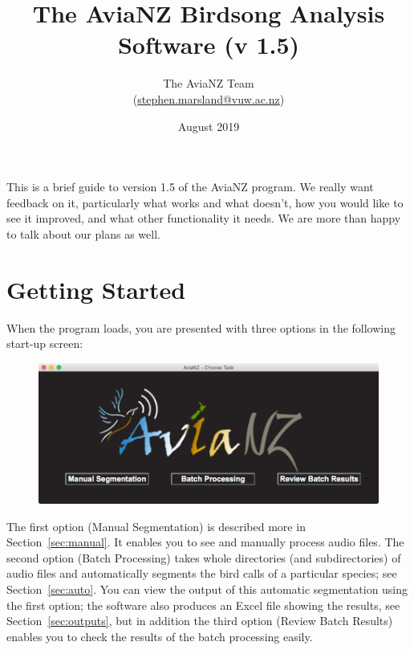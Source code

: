 \documentclass{article}
\title{The AviaNZ Birdsong Analysis Software (v 1.5)}
\author{The AviaNZ Team \\(\url{stephen.marsland@vuw.ac.nz})}
\date{August 2019}
\begin{document}
\maketitle



This is a brief guide to version 1.5 of the AviaNZ program. 
We really want feedback on it, particularly what works and what doesn't, how you would like to see it improved, and what other functionality it needs. We are more than happy to talk about our plans as well. 


\section{Getting Started}


When the program loads, you are presented with three options in the following start-up screen:

\begin{figure}[h!]
\centering
\includegraphics[width=.3\textwidth]{Figs/splashscreen}
\label{welcome}
\end{figure}

The first option (Manual Segmentation) is described more in Section~\ref{sec:manual}. It enables you to see and manually process audio files. The second option (Batch Processing) takes whole directories (and subdirectories) of audio files and automatically segments the bird calls of a particular species; see Section~\ref{sec:auto}. You can view the output of this automatic segmentation using the first option; the software also produces an Excel file showing the results, see Section~\ref{sec:outputs}, but in addition the third option (Review Batch Results) enables you to check the results of the batch processing easily. 
\end{document}
